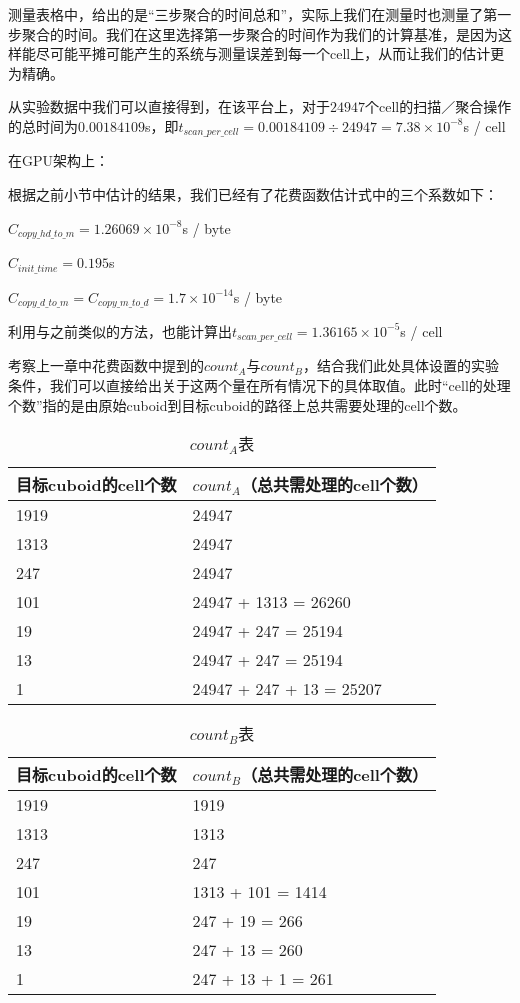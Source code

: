 测量表格中，给出的是“三步聚合的时间总和”，实际上我们在测量时也测量了第一步聚合的时间。我们在这里选择第一步聚合的时间作为我们的计算基准，是因为这样能尽可能平摊可能产生的系统与测量误差到每一个cell上，从而让我们的估计更为精确。

从实验数据中我们可以直接得到，在该平台上，对于$24947$个cell的扫描／聚合操作的总时间为$0.00184109$s，即$t_{scan\_per\_cell} = 0.00184109 \div 24947 = 7.38 \times 10^{-8}$s / cell

在GPU架构上：

根据之前小节中估计的结果，我们已经有了花费函数估计式中的三个系数如下：

$C_{copy\_hd\_to\_m} = 1.26069 \times 10^{-8}$s / byte

$C_{init\_time} = 0.195$s

$C_{copy\_d\_to\_m} = C_{copy\_m\_to\_d} = 1.7 \times 10^{-14}$s / byte

利用与之前类似的方法，也能计算出$t_{scan\_per\_cell} = 1.36165 \times 10^{-5}$s / cell

考察上一章中花费函数中提到的$count_A$与$count_B$，结合我们此处具体设置的实验条件，我们可以直接给出关于这两个量在所有情况下的具体取值。此时“cell的处理个数”指的是由原始cuboid到目标cuboid的路径上总共需要处理的cell个数。

\begin{table}[!htbp]
\centering
\caption{$count_A$表} 
\label{tab:table11}
\begin{tabular}{|l|l|}
    \hline
    目标cuboid的cell个数 & $count_A$（总共需处理的cell个数）\\
    \hline
    1919 & 24947\\
    \hline
    1313 & 24947\\
    \hline
    247 & 24947\\
    \hline
    101 & 24947 + 1313 = 26260\\
    \hline
    19 & 24947 + 247 = 25194\\
    \hline
    13 & 24947 + 247 = 25194\\
    \hline
    1 & 24947 + 247 + 13 = 25207\\
    \hline
\end{tabular}
\end{table}

\begin{table}[!htbp]
\centering
\caption{$count_B$表} 
\label{tab:table12}
\begin{tabular}{|l|l|}
    \hline
    目标cuboid的cell个数 & $count_B$（总共需处理的cell个数）\\
    \hline
    1919 & 1919\\
    \hline
    1313 & 1313\\
    \hline
    247 & 247\\
    \hline
    101 & 1313 + 101 = 1414\\
    \hline
    19 & 247 + 19 = 266\\
    \hline
    13 & 247 + 13 = 260\\
    \hline
    1 & 247 + 13 + 1 = 261\\
    \hline
\end{tabular}
\end{table}

